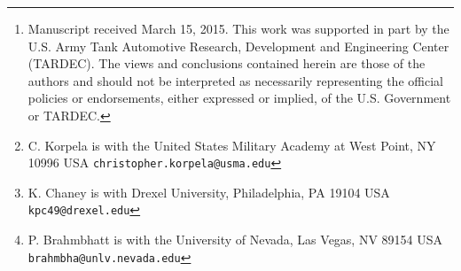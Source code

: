 \author{Christopher Korpela, Kenneth Chaney, and Pareshkumar Brahmbhatt
\thanks{Manuscript received March 15, 2015. This work was supported in part by the U.S. Army Tank Automotive Research, Development and Engineering Center (TARDEC). The views and conclusions contained herein are those of the authors and should not be interpreted as necessarily representing the official policies or endorsements, either expressed or implied, of the U.S. Government or TARDEC.}
\thanks{C. Korpela is with the United States Military Academy at West Point, NY 10996 USA \tt\small{christopher.korpela{@}usma.edu}}
\thanks{K. Chaney is with Drexel University, Philadelphia, PA 19104 USA \tt\small{kpc49{@}drexel.edu}}
\thanks{P. Brahmbhatt is with the University of Nevada, Las Vegas, NV 89154 USA \tt\small{brahmbha{@}unlv.nevada.edu}}}
